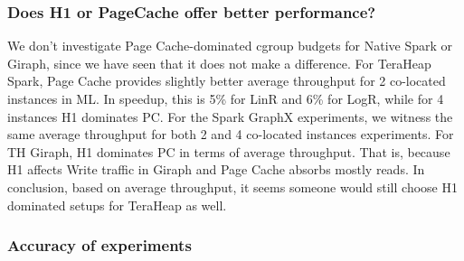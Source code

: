 \subsubsection{Does H1 or PageCache offer better performance?}
We don't investigate Page Cache-dominated cgroup budgets for Native Spark or Giraph, since we have seen that it does not make a difference. For TeraHeap Spark, Page Cache provides slightly better average throughput for 2 co-located instances in ML. In speedup, this is 5\% for LinR and 6\% for LogR, while for 4 instances H1 dominates PC. For the Spark GraphX experiments, we witness the same average throughput for both 2 and 4 co-located instances experiments. For TH Giraph, H1 dominates PC in terms of average throughput. That is, because H1 affects Write traffic in Giraph and Page Cache absorbs mostly reads. In conclusion, based on average throughput, it seems someone would still choose H1 dominated setups for TeraHeap as well.

\subsubsection{Accuracy of experiments}

